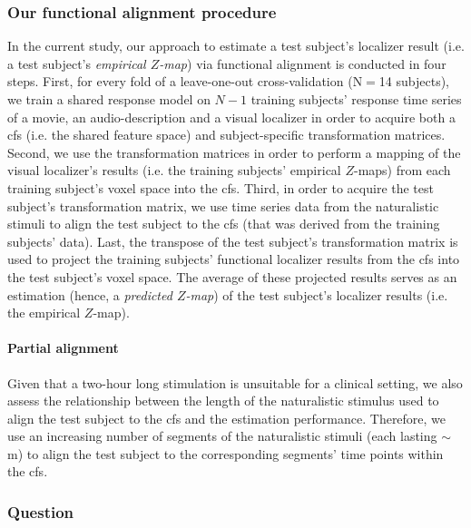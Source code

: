 \subsubsection{Our functional alignment procedure}
%
In the current study, our approach to estimate a test subject's localizer result
(i.e. a test subject's \textit{empirical $Z$-map}) via functional alignment is
conducted in four steps.
First, for every fold of a leave-one-out cross-validation (N$=$14 subjects), we
train a shared response model on $N-1$ training subjects' response time series
of a movie, an audio-description and a visual localizer in order to acquire both
a \ac{cfs} (i.e.  the shared feature space) and subject-specific transformation
matrices.
Second, we use the transformation matrices in order to perform a mapping of the
visual localizer's results (i.e. the training subjects' empirical $Z$-maps) from
each training subject's voxel space into the \ac{cfs}.
Third, in order to acquire the test subject's transformation matrix, we use time
series data from the naturalistic stimuli to align the test subject to the
\ac{cfs} (that was derived from the training subjects' data).
Last, the transpose of the test subject's transformation matrix is used to
project the training subjects' functional localizer results from the \ac{cfs}
into the test subject's voxel space.
The average of these projected results serves as an estimation (hence, a
\textit{predicted $Z$-map}) of the test subject's localizer results (i.e. the
empirical $Z$-map).


\paragraph{Partial alignment}
%
Given that a two-hour long stimulation is unsuitable for a clinical setting, we
also assess the relationship between the length of the naturalistic stimulus
used to align the test subject to the \ac{cfs} and the estimation performance.
%
Therefore, we use an increasing number of segments of the naturalistic stimuli
(each lasting $\sim$\unit[15]{m}) to align the test subject to the corresponding
segments' time points within the \ac{cfs}.


\subsubsection{Question}

